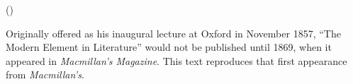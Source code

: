 \author{}
\date{}


\renewcommand{\chaptername}{, }

\thispagestyle{plain}


\begin{raggedright}
{\Large \linespread{1.0} \noindent \textbf{} \par} 

{\large   \par} 

\vspace{0.5em}
\end{raggedright}

\begin{raggedleft}
{\large \linespread{1.2} () \par}
\end{raggedleft}
\vspace{1em}








Originally offered as his inaugural lecture at Oxford in November 1857,
``The Modern Element in Literature'' would not be published until 1869,
when it appeared in \emph{Macmillan's Magazine}. This text reproduces
that first appearance from \emph{Macmillan's}.

